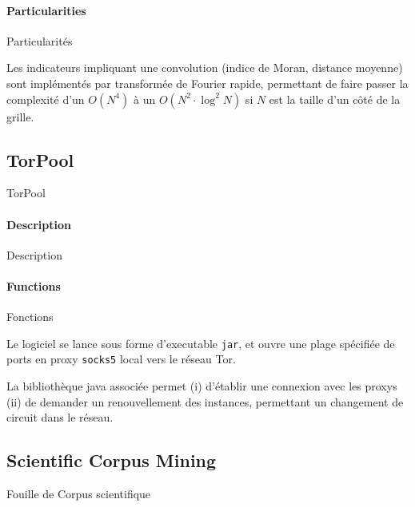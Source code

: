 \paragraph{Particularities}{Particularités}

Les indicateurs impliquant une convolution (indice de Moran, distance moyenne) sont implémentés par transformée de Fourier rapide, permettant de faire passer la complexité d'un $O(N^4)$ à un $O(N^2\cdot \log^2 N)$ si $N$ est la taille d'un côté de la grille. 


\subsection{TorPool}{TorPool}


\paragraph{Description}{Description}


\paragraph{Functions}{Fonctions}

Le logiciel se lance sous forme d'executable \texttt{jar}, et ouvre une plage spécifiée de ports en proxy \texttt{socks5} local vers le réseau Tor.

La bibliothèque java associée permet (i) d'établir une connexion avec les proxys (ii) de demander un renouvellement des instances, permettant un changement de circuit dans le réseau.





\subsection{Scientific Corpus Mining}{Fouille de Corpus scientifique}

